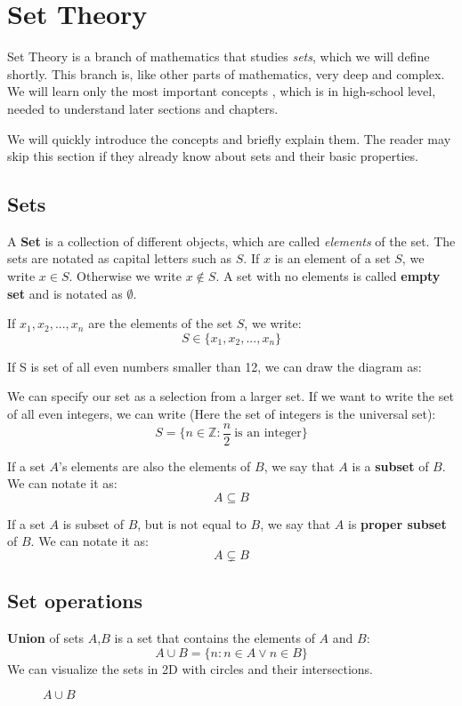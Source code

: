\section{Set Theory}
Set Theory is a branch of mathematics that studies \textit{sets}, which we will define shortly. This branch is, like other parts of mathematics, very deep and complex. We will learn only the most important concepts , which is in high-school level, needed to understand later sections and chapters.
\par
We will quickly introduce the concepts and briefly explain them. The reader may skip this section if they already know about sets and their basic properties.

\subsection*{Sets}
A \textbf{Set} is a collection of different objects, which are called \textit{elements} of the set. The sets are notated as capital letters such as $S$.
If $x$ is an element of a set $S$, we write $x \in S$. Otherwise we write $ x \not\in S$. A set with no elements is called \textbf{empty set} and is notated as $\emptyset$. \par
If $x_1,x_2,...,x_n$ are the elements of the set $S$, we write:
$$ S \in \{x_1,x_2,...,x_n\} $$
\par
If S is set of all even numbers smaller than 12, we can draw the diagram as:



We can specify our set  as a selection from a larger set. If we want to write the set of all even integers, we can write (Here the set of integers is the universal set):
$$ S = \{n \in \mathbb{Z}: \frac{n}{2} \ \text{is an integer} \}$$
\par 
If a set $A$'s elements are also the elements of $B$, we say that $A$ is a \textbf{subset} of $B$. We can notate it as:
$$ A \subseteq B $$
\par
If a set $A$ is subset of $B$, but is not equal to $B$, we say that $A$ is \textbf{proper subset} of $B$. We can notate it as:
$$A \subsetneq B$$

\subsection*{Set operations}
\textbf{Union} of sets $A$,$B$ is a set that contains the elements of $A$ and $B$:
$$A \cup B = \{n:n \in A  \lor  n  \in B\}$$
We can visualize the sets in 2D with circles and their intersections.  
\begin{figure}[!h]
    \centering
    
    \caption{$A \cup B$}
\end{figure}











